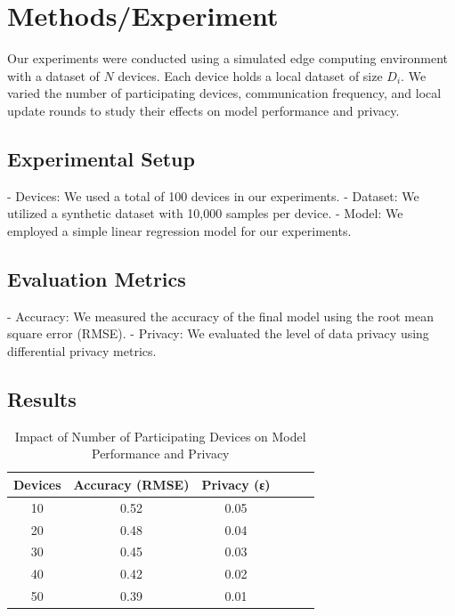 \documentclass{article}
\begin{document}
\section{Methods/Experiment}
Our experiments were conducted using a simulated edge computing environment with a dataset of $N$ devices. Each device holds a local dataset of size $D_i$. We varied the number of participating devices, communication frequency, and local update rounds to study their effects on model performance and privacy.

\subsection{Experimental Setup}
- Devices: We used a total of 100 devices in our experiments.
- Dataset: We utilized a synthetic dataset with 10,000 samples per device.
- Model: We employed a simple linear regression model for our experiments.

\subsection{Evaluation Metrics}
- Accuracy: We measured the accuracy of the final model using the root mean square error (RMSE).
- Privacy: We evaluated the level of data privacy using differential privacy metrics.

\subsection{Results}
\begin{table}[ht]
\centering
\caption{Impact of Number of Participating Devices on Model Performance and Privacy}
\label{tab:devices}
\begin{tabular}{@{}cccccc@{}}
\toprule
\textbf{Devices} & \textbf{Accuracy (RMSE)} & \textbf{Privacy (ε)} \\ \midrule
10               & 0.52                    & 0.05                 \\
20               & 0.48                    & 0.04                 \\
30               & 0.45                    & 0.03                 \\
40               & 0.42                    & 0.02                 \\
50               & 0.39                    & 0.01                 \\ \bottomrule
\end{tabular}
\end{table}
\end{document}
